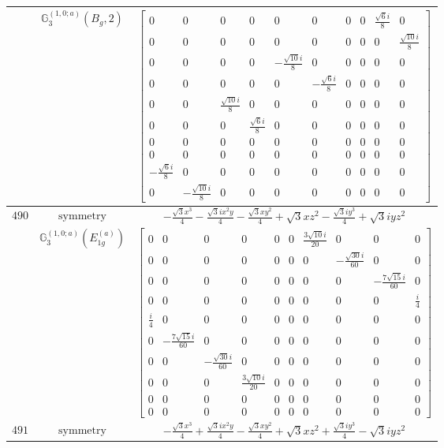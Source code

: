 \documentclass[fleqn,8pt,landscape]{jsarticle}
\begin{document}
\begin{longtable}{ccc}
$  $ & $ \mathbb{G}_{3}^{(1,0;a)}(B_{g},2) $ & $ \begin{bmatrix} 0 & 0 & 0 & 0 & 0 & 0 & 0 & 0 & \frac{\sqrt{6} i}{8} & 0 \\ 0 & 0 & 0 & 0 & 0 & 0 & 0 & 0 & 0 & \frac{\sqrt{10} i}{8} \\ 0 & 0 & 0 & 0 & - \frac{\sqrt{10} i}{8} & 0 & 0 & 0 & 0 & 0 \\ 0 & 0 & 0 & 0 & 0 & - \frac{\sqrt{6} i}{8} & 0 & 0 & 0 & 0 \\ 0 & 0 & \frac{\sqrt{10} i}{8} & 0 & 0 & 0 & 0 & 0 & 0 & 0 \\ 0 & 0 & 0 & \frac{\sqrt{6} i}{8} & 0 & 0 & 0 & 0 & 0 & 0 \\ 0 & 0 & 0 & 0 & 0 & 0 & 0 & 0 & 0 & 0 \\ 0 & 0 & 0 & 0 & 0 & 0 & 0 & 0 & 0 & 0 \\ - \frac{\sqrt{6} i}{8} & 0 & 0 & 0 & 0 & 0 & 0 & 0 & 0 & 0 \\ 0 & - \frac{\sqrt{10} i}{8} & 0 & 0 & 0 & 0 & 0 & 0 & 0 & 0 \end{bmatrix} $ \\ \hline
$ 490 $ & $ \text{symmetry} $ & $ - \frac{\sqrt{3} x^{3}}{4} - \frac{\sqrt{3} i x^{2} y}{4} - \frac{\sqrt{3} x y^{2}}{4} + \sqrt{3} x z^{2} - \frac{\sqrt{3} i y^{3}}{4} + \sqrt{3} i y z^{2} $ \\
$  $ & $ \mathbb{G}_{3}^{(1,0;a)}(E_{1g}^{(a)}) $ & $ \begin{bmatrix} 0 & 0 & 0 & 0 & 0 & 0 & \frac{3 \sqrt{10} i}{20} & 0 & 0 & 0 \\ 0 & 0 & 0 & 0 & 0 & 0 & 0 & - \frac{\sqrt{30} i}{60} & 0 & 0 \\ 0 & 0 & 0 & 0 & 0 & 0 & 0 & 0 & - \frac{7 \sqrt{15} i}{60} & 0 \\ 0 & 0 & 0 & 0 & 0 & 0 & 0 & 0 & 0 & \frac{i}{4} \\ \frac{i}{4} & 0 & 0 & 0 & 0 & 0 & 0 & 0 & 0 & 0 \\ 0 & - \frac{7 \sqrt{15} i}{60} & 0 & 0 & 0 & 0 & 0 & 0 & 0 & 0 \\ 0 & 0 & - \frac{\sqrt{30} i}{60} & 0 & 0 & 0 & 0 & 0 & 0 & 0 \\ 0 & 0 & 0 & \frac{3 \sqrt{10} i}{20} & 0 & 0 & 0 & 0 & 0 & 0 \\ 0 & 0 & 0 & 0 & 0 & 0 & 0 & 0 & 0 & 0 \\ 0 & 0 & 0 & 0 & 0 & 0 & 0 & 0 & 0 & 0 \end{bmatrix} $ \\ \hline
$ 491 $ & $ \text{symmetry} $ & $ - \frac{\sqrt{3} x^{3}}{4} + \frac{\sqrt{3} i x^{2} y}{4} - \frac{\sqrt{3} x y^{2}}{4} + \sqrt{3} x z^{2} + \frac{\sqrt{3} i y^{3}}{4} - \sqrt{3} i y z^{2} $ \\

\end{longtable}
\end{document}
